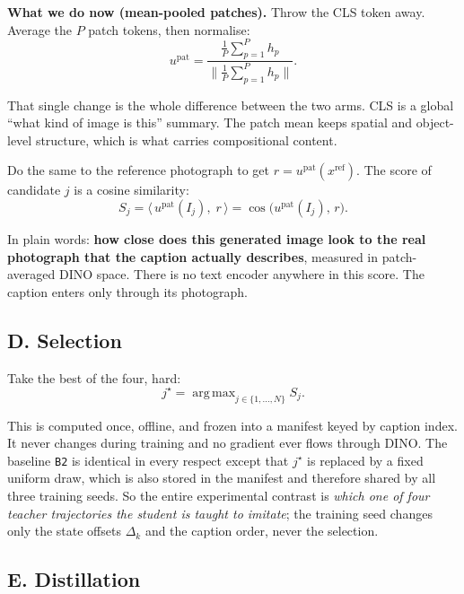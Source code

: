 \documentclass[11pt,a4paper]{article}
\DeclareMathOperator*{\argmax}{arg\,max}
\begin{document}
\noindent\textbf{What we do now (mean-pooled patches).} Throw the CLS token away. Average the $P$ patch tokens, then normalise:
\begin{equation}
u^{\text{pat}} = \frac{\frac{1}{P}\sum_{p=1}^{P} h_p}{\Big\lVert \frac{1}{P}\sum_{p=1}^{P} h_p \Big\rVert}.
\end{equation}

That single change is the whole difference between the two arms. CLS is a global ``what kind of image is this'' summary. The patch mean keeps spatial and object-level structure, which is what carries compositional content.

Do the same to the reference photograph to get $r = u^{\text{pat}}(x^{\text{ref}})$. The score of candidate $j$ is a cosine similarity:
\begin{equation}
S_j = \big\langle\, u^{\text{pat}}(I_j),\; r \,\big\rangle = \cos\big(u^{\text{pat}}(I_j),\, r\big).
\end{equation}

In plain words: \textbf{how close does this generated image look to the real photograph that the caption actually describes}, measured in patch-averaged DINO space. There is no text encoder anywhere in this score. The caption enters only through its photograph.

\subsection*{D. Selection}

Take the best of the four, hard:
\begin{equation}
j^\star = \argmax_{j \in \{1,\ldots,N\}} S_j.
\end{equation}

This is computed once, offline, and frozen into a manifest keyed by caption index. It never changes during training and no gradient ever flows through DINO. The baseline \texttt{B2} is identical in every respect except that $j^\star$ is replaced by a fixed uniform draw, which is also stored in the manifest and therefore shared by all three training seeds. So the entire experimental contrast is \emph{which one of four teacher trajectories the student is taught to imitate}; the training seed changes only the state offsets $\Delta_k$ and the caption order, never the selection.

\subsection*{E. Distillation}
\end{document}
